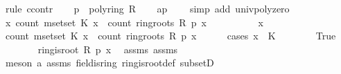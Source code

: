 \begin{isabellebody}
%
\isadelimproof
%
\endisadelimproof
%
\isatagproof
{}\isamarkupfalse%
\ {\isacharparenleft}{\kern0pt}rule\ ccontr{\isacharparenright}{\kern0pt}\isanewline
\ \ \isamarkupfalse%
\ {\isachardoublequoteopen}p\ {\isasymnoteq}\ {\isasymzero}\isactrlbsub poly{\isacharunderscore}{\kern0pt}ring\ R\isactrlesub {\isachardoublequoteclose}\isanewline
\ \ \isamarkupfalse%
\ a{\isacharcolon}{\kern0pt}{\isachardoublequoteopen}p\ {\isasymnoteq}\ {\isacharbrackleft}{\kern0pt}{\isacharbrackright}{\kern0pt}{\isachardoublequoteclose}\ \isamarkupfalse%
\ {\isacharparenleft}{\kern0pt}simp\ add{\isacharcolon}{\kern0pt}\ univ{\isacharunderscore}{\kern0pt}poly{\isacharunderscore}{\kern0pt}zero{\isacharparenright}{\kern0pt}\isanewline
\ \ \isamarkupfalse%
\ {\isachardoublequoteopen}{\isasymAnd}x{\isachardot}{\kern0pt}\ count\ {\isacharparenleft}{\kern0pt}mset{\isacharunderscore}{\kern0pt}set\ K{\isacharparenright}{\kern0pt}\ x\ {\isasymle}\ count\ {\isacharparenleft}{\kern0pt}ring{\isachardot}{\kern0pt}roots\ R\ p{\isacharparenright}{\kern0pt}\ x{\isachardoublequoteclose}\isanewline
\ \ \isamarkupfalse%
\ {\isacharminus}{\kern0pt}\isanewline
\ \ \ \ \isamarkupfalse%
\ x\isanewline
\ \ \ \ \isamarkupfalse%
\ {\isachardoublequoteopen}count\ {\isacharparenleft}{\kern0pt}mset{\isacharunderscore}{\kern0pt}set\ K{\isacharparenright}{\kern0pt}\ x\ {\isasymle}\ count\ {\isacharparenleft}{\kern0pt}ring{\isachardot}{\kern0pt}roots\ R\ p{\isacharparenright}{\kern0pt}\ x{\isachardoublequoteclose}\isanewline
\ \ \ \ \isamarkupfalse%
\ {\isacharparenleft}{\kern0pt}cases\ {\isachardoublequoteopen}x\ {\isasymin}\ K{\isachardoublequoteclose}{\isacharparenright}{\kern0pt}\isanewline
\ \ \ \ \ \ \isamarkupfalse%
\ True\isanewline
\ \ \ \ \ \ \isamarkupfalse%
\ {\isachardoublequoteopen}ring{\isachardot}{\kern0pt}is{\isacharunderscore}{\kern0pt}root\ R\ p\ x{\isachardoublequoteclose}\ \isamarkupfalse%
\ assms{\isacharparenleft}{\kern0pt}{}{\isacharparenright}{\kern0pt}\ assms{\isacharparenleft}{\kern0pt}{}{\isacharparenright}{\kern0pt}\ \isanewline
\ \ \ \ \ \ \ \ \isamarkupfalse%
\ {\isacharparenleft}{\kern0pt}meson\ a\ assms{\isacharparenleft}{\kern0pt}{}{\isacharparenright}{\kern0pt}\ field{\isachardot}{\kern0pt}is{\isacharunderscore}{\kern0pt}ring\ ring{\isachardot}{\kern0pt}is{\isacharunderscore}{\kern0pt}root{\isacharunderscore}{\kern0pt}def\ subsetD{\isacharparenright}{\kern0pt}\isanewline

\end{isabellebody}
